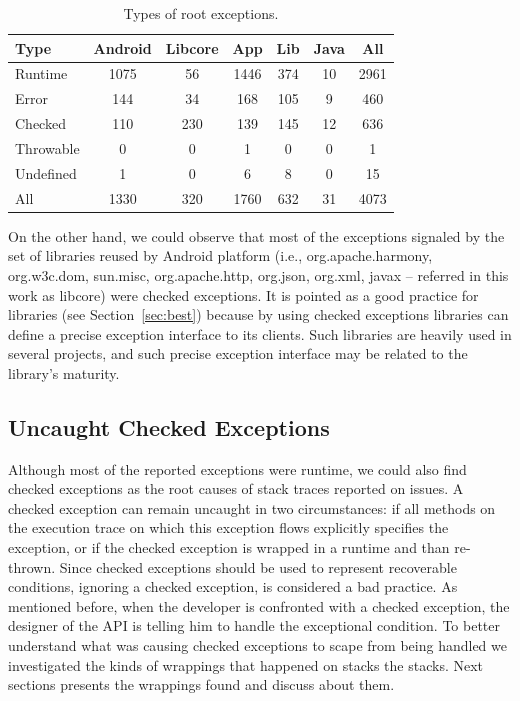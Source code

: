 \documentclass[conference]{IEEEtran}
\begin{document}
\begin{table}
\centering
\begin{tabular}{lcccccc}
    \hline
    \bfseries{Type} & \bfseries{Android} & \bfseries{Libcore} & \bfseries{App} & \bfseries{Lib} & \bfseries{Java} & \bfseries{All}\\
    \hline

Runtime	&	1075	&	56	&	1446	&	374	&	10	&	2961	\\
Error	&	144	&	34	&	168	&	105	&	9	&	460	\\
Checked	&	110	&	230	&	139	&	145	&	12	&	636	\\
Throwable	&	0	&	0	&	1	&	0	&	0	&	1	\\
Undefined	&	1	&	0	&	6	&	8	&	0	&	15	\\
    \hline
All		& 1330	&	320	&	1760	&	632	&	31	&	4073	\\
    \hline
  \end{tabular}
\caption{Types of root exceptions.}
  \label{tab:typeroottab}
\end{table}



On the other hand, we could observe that most of the exceptions signaled by the set of 
libraries reused by Android platform (i.e., org.apache.harmony,
org.w3c.dom, sun.misc, org.apache.http, org.json, org.xml, javax -- referred in
this work as libcore) were checked exceptions. It is pointed as a good practice
for libraries (see Section~\ref{sec:best}) because by using checked exceptions
libraries can define a precise exception interface to its clients. Such
libraries are heavily used in several projects, and such precise exception
interface may be related to the library's maturity.

\subsection{Uncaught Checked Exceptions}

Although most of the  reported exceptions were runtime, we could also find checked
exceptions as the root causes of stack traces reported on issues. A checked exception
can remain uncaught in two circumstances: if all methods on the execution trace
on which this exception flows explicitly specifies the exception, or if the
checked exception is wrapped in a runtime and than re-thrown. Since checked exceptions 
should be used to represent recoverable conditions, ignoring a
checked exception, is considered a bad practice. As mentioned before, when the developer is confronted
with a checked exception, the designer of the API is telling him to handle the
exceptional condition. To better understand what was causing checked exceptions
to scape from being handled we investigated the kinds of wrappings that happened
on stacks the stacks.  Next sections presents the wrappings found and discuss
about them.
\end{document}
